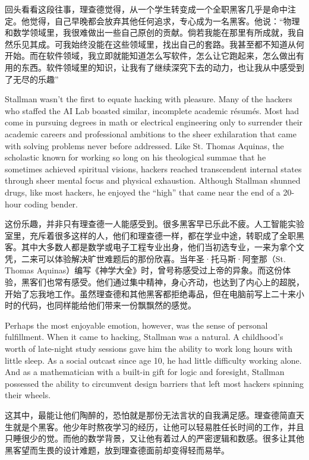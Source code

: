 \ifdefined\chs
回头看看这段往事，理查德觉得，从一个学生转变成一个全职黑客几乎是命中注定。他觉得，自己早晚都会放弃其他任何追求，专心成为一名黑客。他说：“物理和数学领域里，我很难做出一些自己原创的贡献。倘若我能在那里有所成就，我自然乐见其成。可我始终没能在这些领域里，找出自己的套路。我甚至都不知道从何开始。而在软件领域，我立即就能知道怎么写软件，怎么让它跑起来，怎么做出有用的东西。软件领域里的知识，让我有了继续深究下去的动力，也让我从中感受到了无尽的乐趣”
\fi

\ifdefined\eng
Stallman wasn't the first to equate hacking with pleasure. Many of the hackers who staffed the AI Lab boasted similar, incomplete academic résumés. Most had come in pursuing degrees in math or electrical engineering only to surrender their academic careers and professional ambitions to the sheer exhilaration that came with solving problems never before addressed. Like St. Thomas Aquinas, the scholastic known for working so long on his theological summae that he sometimes achieved spiritual visions, hackers reached transcendent internal states through sheer mental focus and physical exhaustion. Although Stallman shunned drugs, like most hackers, he enjoyed the ``high'' that came near the end of a 20-hour coding bender.
\fi

\ifdefined\chs
这份乐趣，并非只有理查德一人能感受到。很多黑客早已乐此不疲。人工智能实验室里，充斥着很多这样的人，他们和理查德一样，都在学业中途，转职成了全职黑客。其中大多数人都是数学或电子工程专业出身，他们当初选专业，一来为拿个文凭，二来可以体验解决旷世难题后的那份欣喜。当年圣·托马斯·阿奎那（St. Thomas Aquinas）编写《神学大全》时，曾号称感受过上帝的异象。而这份体验，黑客们也常有感受。他们通过集中精神，身心齐动，也达到了内心上的超脱，开始了忘我地工作。虽然理查德和其他黑客都拒绝毒品，但在电脑前写上二十来小时的代码，也同样能给他们带来一份飘飘然的感觉。
\fi

\ifdefined\eng
Perhaps the most enjoyable emotion, however, was the sense of personal fulfillment. When it came to hacking, Stallman was a natural. A childhood's worth of late-night study sessions gave him the ability to work long hours with little sleep. As a social outcast since age 10, he had little difficulty working alone. And as a mathematician with a built-in gift for logic and foresight, Stallman possessed the ability to circumvent design barriers that left most hackers spinning their wheels.
\fi

\ifdefined\chs
这其中，最能让他们陶醉的，恐怕就是那份无法言状的自我满足感。理查德简直天生就是个黑客。他少年时熬夜学习的经历，让他可以轻易胜任长时间的工作，并且只睡很少的觉。而他的数学背景，又让他有着过人的严密逻辑和数感。很多让其他黑客望而生畏的设计难题，放到理查德面前却变得轻而易举。
\fi

